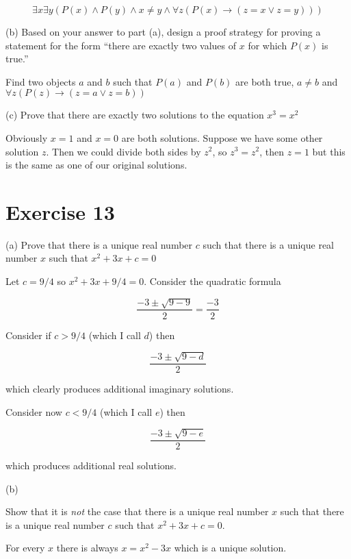 \documentclass[11pt]{article}
\newcommand{\then}{\rightarrow}
\begin{document}
$$\exists x \exists y (P(x) \wedge P(y) \wedge x \neq y \wedge \forall z (P(x) \then (z = x \vee z = y)))$$

\noindent (b) Based on your answer to part (a), design a proof strategy for proving
a statement for the form ``there are exactly two values 
of $x$ for which $P(x)$ is true.''

Find two objects $a$ and $b$ such that $P(a)$ and $P(b)$ are both true,
$a \neq b$ and 
$\forall z (P(z) \then (z = a \vee z = b))$

\noindent (c) Prove that there are exactly two solutions to the equation 
$x^3 = x^2$

Obviously $x = 1$ and $x = 0$ are both solutions. Suppose we have some other 
solution $z$. Then we could divide both sides by $z^2$, so $z^3 = z^2$, then 
$z = 1$ but this is the same as one of our original solutions.

\section*{Exercise 13}

\noindent (a) Prove that there is a unique real number $c$ such that there is a 
unique real number $x$ such that $x^2 + 3x + c = 0$

Let $c = 9/4$ so $x^2 + 3x + 9/4 = 0$. Consider the quadratic formula 

$$\frac{-3 \pm \sqrt{9-9}}{2} = \frac{-3}{2}$$

Consider if $c > 9/4$ (which I call $d$) then 

$$\frac{-3 \pm \sqrt{9-d}}{2}$$

which clearly produces additional imaginary solutions.

Consider now $c < 9/4$ (which I call $e$) then 

$$\frac{-3 \pm \sqrt{9-e}}{2}$$

which produces additional real solutions.

\noindent (b)

Show that it is \textit{not} the case that there is a unique real number $x$ 
such that there is a unique real number $c$ such that $x^2 + 3x + c = 0$.

For every $x$ there is always $x = x^2 -3x$ which is a unique solution.
\end{document}
